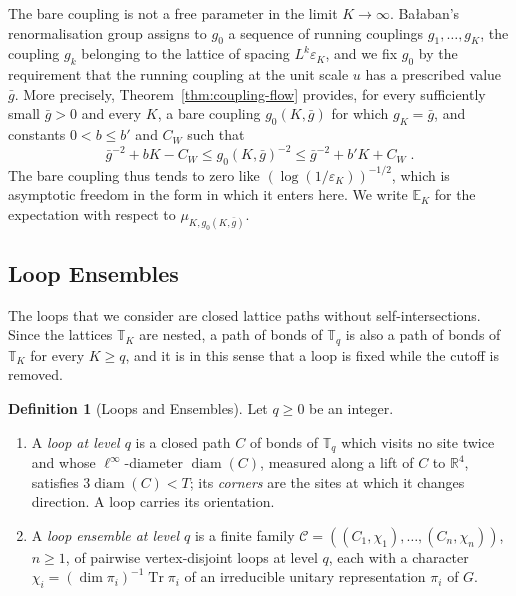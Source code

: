 \documentclass[11pt]{preprint}
\newcommand{\diam}{\operatorname{diam}}
\numberwithin{equation}{section}
\theoremstyle{definition}
\newtheorem{definition}[theorem]{Definition}
\theoremstyle{remark}
\theoremstyle{plain}
\begin{document}
The bare coupling is not a free parameter in the limit $K \to \infty$. Ba{\l}aban's renormalisation group assigns to $g_0$ a sequence of running couplings $g_1, \dots, g_K$, the coupling $g_k$ belonging to the lattice of spacing $L^k\varepsilon_K$, and we fix $g_0$ by the requirement that the running coupling at the unit scale $u$ has a prescribed value $\bar g$. More precisely, Theorem~\ref{thm:coupling-flow} provides, for every sufficiently small $\bar g > 0$ and every $K$, a bare coupling $g_0(K, \bar g)$ for which $g_K = \bar g$, and constants $0 < b \leq b'$ and $C_W$ such that
\begin{equation}\label{eq:bare-coupling-window}
    \bar g^{-2} + bK - C_W \leq g_0(K, \bar g)^{-2} \leq \bar g^{-2} + b'K + C_W\;.
\end{equation}
The bare coupling thus tends to zero like $(\log(1/\varepsilon_K))^{-1/2}$, which is asymptotic freedom in the form in which it enters here. We write $\mathbb E_K$ for the expectation with respect to $\mu_{K,g_0(K,\bar g)}$.

\subsection{Loop Ensembles}\label{sec:loop-ensembles}

The loops that we consider are closed lattice paths without self-intersections. Since the lattices $\mathbb T_K$ are nested, a path of bonds of $\mathbb T_q$ is also a path of bonds of $\mathbb T_K$ for every $K \geq q$, and it is in this sense that a loop is fixed while the cutoff is removed.

\begin{definition}[Loops and Ensembles]\label{def:loop-ensemble}
Let $q \geq 0$ be an integer.
\begin{enumerate}[label=(\roman*)]
\item A \emph{loop at level $q$} is a closed path $C$ of bonds of $\mathbb T_q$ which visits no site twice and whose $\ell^\infty$-diameter $\diam(C)$, measured along a lift of $C$ to $\mathbb R^4$, satisfies $3\diam(C) < T$; its \emph{corners} are the sites at which it changes direction. A loop carries its orientation.
\item A \emph{loop ensemble at level $q$} is a finite family $\mathcal C = ((C_1, \chi_1), \dots, (C_n, \chi_n))$, $n \geq 1$, of pairwise vertex-disjoint loops at level $q$, each with a character $\chi_i = (\dim\pi_i)^{-1}\operatorname{Tr}\pi_i$ of an irreducible unitary representation $\pi_i$ of $G$.
\end{enumerate}
\end{definition}
\end{document}
